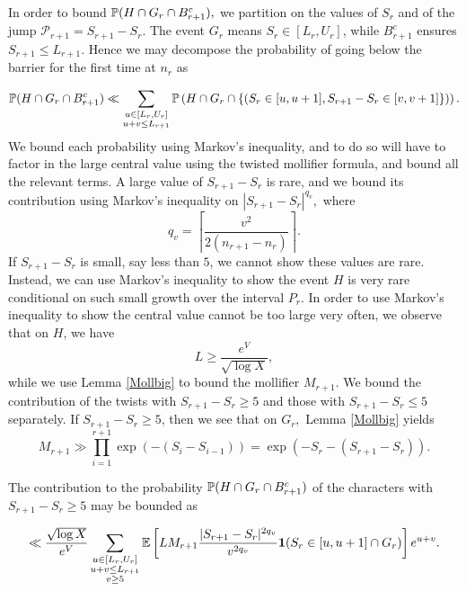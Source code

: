 \documentclass[12pt]{amsart}
\def\P{\ensuremath\mathbb{P}}
\def\E{\ensuremath\mathbb{E}}
\numberwithin{equation}{section}
\numberwithin{thm}{section}
\newcommand{\1}{\mathbf 1}
\begin{document}
In order to bound $\P(H\cap G_r\cap B_{r+1}^c),$ we partition on the values of $S_{r}$ and of the jump $\mathscr{P}_{r+1}=S_{{r+1}}-S_{r}.$ The event $G_r$ means $S_{r}\in [L_r,U_r]$, while $B_{r+1}^c$ ensures $S_{{r+1}}\le L_{r+1}.$ Hence we may decompose the probability of going below the barrier for the first time at $n_r$ as

\begin{equation}\label{Pvsplit}
	\P(H\cap G_r\cap B_{r+1}^c)\ll  \sum_{\substack{u\in [L_r,U_r]\\ u+v \le L_{r+1}}}\P\left(H\cap G_r\cap\{(S_{r}\in [u,u+1], S_{{r+1}}-S_{r}\in [v,v+1]\} )	
	\right).\end{equation} 
 We bound each probability using Markov's inequality, and to do so will have to factor in the large central value using the twisted mollifier formula, and bound all the relevant terms.
   A large value of $S_{{r+1}}-S_{r}$ is rare, and we bound its contribution using Markov's inequality on $|S_{{r+1}}-S_{r}|^{q_v},$ where \begin{equation}\label{eqn: qv}
 	q_v=\left\lceil \frac{v^2}{2\left(n_{r+1}-n_{r}\right)}\right\rceil.
 \end{equation} If $S_{{r+1}}-S_{r}$ is small, say less than $5$, we cannot show these values are rare. Instead, we can use Markov's inequality to show the event $H$ is very rare conditional on such small growth over the interval $P_r$. 
 In order to use Markov's inequality to show the central value cannot be too large very often, we observe that on $H$, we have \begin{equation}
 	L\ge \frac{e^V}{\sqrt{\log X}},
 \end{equation}
 while we use Lemma \ref{Mollbig} to bound the mollifier $M_{r+1}$. 
 We bound the contribution of the twists  with $ S_{{r+1}}-S_{r}\ge 5$ and those with $S_{{r+1}}-S_{r}\le 5$ separately. 
 If $ S_{{r+1}}-S_{r}\ge 5$, then we see that on $G_{r},$ Lemma \ref{Mollbig} yields
\begin{equation}
	M_{r+1}\gg \prod^{r+1}_{i=1}\exp(-\left(S_{i}-S_{{i-1}}\right))= \exp(-S_{r}-(S_{{r+1}}-S_{r})).
\end{equation}

The contribution to the probability $\P(H\cap G_r\cap B_{r+1}^c)$ of the characters with $S_{{r+1}}-S_{r}\ge 5$ may be bounded as  


\begin{align}
	\ll \frac{\sqrt{\log X}}{e^V}\sum_{\substack{u\in [L_r,U_r]\\ u+v \le L_{r+1}\\ v\ge 5}}\E\left[L M_{r+1} \frac{|S_{{r+1}}-S_{r}|^{2q_v}}{v^{2q_v}}\mathbf{1}(S_{r}\in [u,u+1]\cap G_r)\right] e^{u+v} .
\end{align}
\end{document}

